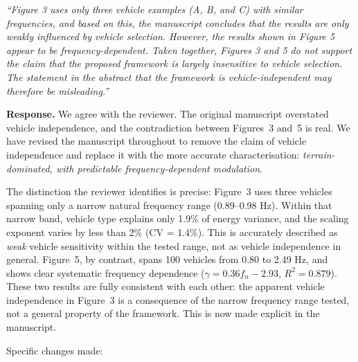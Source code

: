 \documentclass[11pt]{article}
\newcommand{\revquote}[1]{\medskip\noindent\textit{``#1''}\medskip}
\begin{document}
\revquote{Figure 3 uses only three vehicle examples (A, B, and C) with similar frequencies, and based on this, the manuscript concludes that the results are only weakly influenced by vehicle selection. However, the results shown in Figure 5 appear to be frequency-dependent. Taken together, Figures 3 and 5 do not support the claim that the proposed framework is largely insensitive to vehicle selection. The statement in the abstract that the framework is vehicle-independent may therefore be misleading.}

\noindent\textbf{Response.} We agree with the reviewer. The original manuscript overstated vehicle independence, and the contradiction between Figures~3 and~5 is real. We have revised the manuscript throughout to remove the claim of vehicle independence and replace it with the more accurate characterisation: \emph{terrain-dominated, with predictable frequency-dependent modulation}.

The distinction the reviewer identifies is precise: Figure~3 uses three vehicles spanning only a narrow natural frequency range (0.89--0.98 Hz). Within that narrow band, vehicle type explains only 1.9\% of energy variance, and the scaling exponent varies by less than 2\% (CV = 1.4\%). This is accurately described as \emph{weak} vehicle sensitivity within the tested range, not as vehicle independence in general. Figure~5, by contrast, spans 100 vehicles from 0.80 to 2.49 Hz, and shows clear systematic frequency dependence ($\gamma = 0.36f_n - 2.93$, $R^2 = 0.879$). These two results are fully consistent with each other: the apparent vehicle independence in Figure~3 is a consequence of the narrow frequency range tested, not a general property of the framework. This is now made explicit in the manuscript.

Specific changes made:
\end{document}
